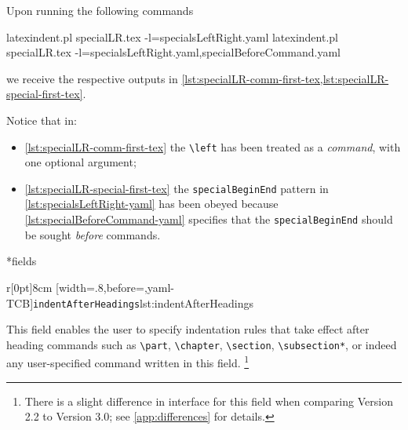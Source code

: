 	Upon running the following commands \begin{widepage} \begin{commandshell}
latexindent.pl specialLR.tex -l=specialsLeftRight.yaml      
latexindent.pl specialLR.tex -l=specialsLeftRight.yaml,specialBeforeCommand.yaml      
    \end{commandshell} \end{widepage} we receive the respective outputs in \cref{lst:specialLR-comm-first-tex,lst:specialLR-special-first-tex}.

	\begin{minipage}{.49\linewidth}
	\end{minipage}
	\hfill
	\begin{minipage}{.49\linewidth}
	\end{minipage}

	Notice that in: \begin{itemize} \item \cref{lst:specialLR-comm-first-tex} the \lstinline!\left! has been treated as a \emph{command}, with one optional argument;
		\item \cref{lst:specialLR-special-first-tex} the \texttt{specialBeginEnd} pattern in \cref{lst:specialsLeftRight-yaml} has been obeyed because \cref{lst:specialBeforeCommand-yaml} specifies that the \texttt{specialBeginEnd} should be sought \emph{before} commands.
	\end{itemize}

*{fields}
	\begin{wrapfigure}[17]{r}[0pt]{8cm}
		[width=.8\linewidth,before=\centering,yaml-TCB]{\texttt{indentAfterHeadings}}{lst:indentAfterHeadings}
	\end{wrapfigure}
	This field enables the user to specify indentation rules that take effect after heading commands such as \lstinline!\part!, \lstinline!\chapter!, \lstinline!\section!, \lstinline!\subsection*!, or indeed any user-specified command written in this field.
	\footnote{There is a slight
		difference in interface for this field when comparing Version 2.2 to Version 3.0; see \vref{app:differences} for details.}

